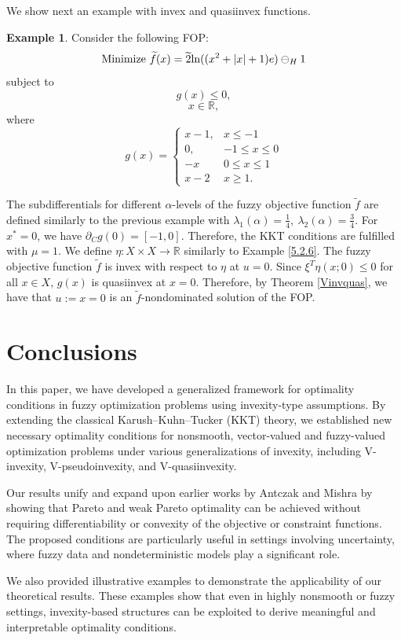 \documentclass{article}
\theoremstyle{definition}
\newtheorem{example}[maar]{Example}
\begin{document}
We show next an example with invex and quasiinvex functions.
\begin{example} Consider the following FOP:
$$\textnormal{Minimize}\ \widetilde f(x) = \widetilde 2 \textnormal{ln}((x^2 + |x| + 1)e)\ominus_H  1$$
subject to
$$g(x) \leq 0,$$
$$x\in \mathbb R,$$
where
$$g(x) = \begin{cases} x-1, & x \leq -1 \\
0, & -1 \leq x \leq 0 \\
-x & 0 \leq x \leq 1 \\
x-2 & x \geq 1.
\end{cases}$$

The subdifferentials for different $\alpha$-levels of the fuzzy objective function $\widetilde f$ are defined similarly to the previous example with $ \lambda_1(\alpha) = \frac{1}{4},\  \lambda_2(\alpha) = \frac{3}{4}$. For $x^*=0$, we have $\partial_C g(0) = [-1,0]$. Therefore, the KKT conditions are fulfilled with $\mu = 1$. We define $\eta: X \times X \rightarrow \mathbb R$ similarly to Example \ref{5.2.6}. The fuzzy objective function $\widetilde f$ is invex with respect to $\eta$ at $u = 0$. Since $\xi^T \eta(x;0) \leq 0$ for all $x \in X$, $g(x)$ is quasiinvex at $x = 0$. Therefore, by Theorem \ref{Vinvquas}, we have that $u:=x=0$ is an $\tilde f$-nondominated solution of the FOP.
\end{example}

\section{Conclusions} \label{conclusions}

In this paper, we have developed a generalized framework for optimality conditions in fuzzy optimization problems using invexity-type assumptions. By extending the classical Karush–Kuhn–Tucker (KKT) theory, we established new necessary optimality conditions for nonsmooth, vector-valued and fuzzy-valued optimization problems under various generalizations of invexity, including V-invexity, V-pseudoinvexity, and V-quasiinvexity.

Our results unify and expand upon earlier works by Antczak and Mishra by showing that Pareto and weak Pareto optimality can be achieved without requiring differentiability or convexity of the objective or constraint functions. The proposed conditions are particularly useful in settings involving uncertainty, where fuzzy data and nondeterministic models play a significant role.

We also provided illustrative examples to demonstrate the applicability of our theoretical results. These examples show that even in highly nonsmooth or fuzzy settings, invexity-based structures can be exploited to derive meaningful and interpretable optimality conditions.
\end{document}
